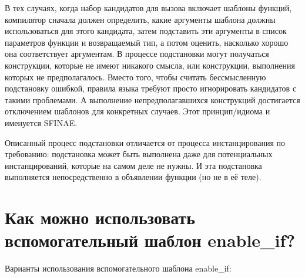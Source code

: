 \documentclass[a4paper,12pt]{article}	%
\begin{document}
	В тех случаях, когда набор кандидатов для вызова включает шаблоны функций, компилятор сначала должен определить, какие аргументы шаблона должны использоваться для этого кандидата, затем подставить эти аргументы в список параметров функции и возвращаемый тип, а потом оценить, насколько хорошо она соответствует аргументам. В процессе подстановки могут получаться конструкции, которые не имеют никакого смысла, или конструкции, выполнения которых не предполагалось. Вместо того, чтобы считать бессмысленную подстановку ошибкой, правила языка требуют просто игнорировать кандидатов с такими проблемами. А выполнение непредполагавшихся конструкций достигается отключением шаблонов для конкретных случаев. Этот принцип/идиома и именуется SFINAE.
	
	Описанный процесс подстановки отличается от процесса инстанцирования по требованию: подстановка может быть выполнена даже для потенциальных инстанцирований, которые на самом деле не нужны. И эта подстановка выполняется непосредственно в объявлении функции (но не в её теле).	
		
\newpage

\section{Как можно использовать вспомогательный шаблон enable\_if?}

	Варианты использования вспомогательного шаблона enable\_if:
	
\end{document}
